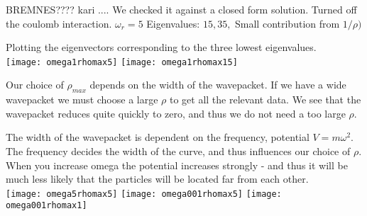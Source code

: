 \documentclass[a4paper,12pt, english]{article}
\begin{document}
BREMNES???? kari ....
We checked it against a closed form solution. Turned off the coulomb interaction. $\omega_r = 5$
Eigenvalues: $15, 35, $
Small contribution from $ 1/ \rho)$



Plotting the eigenvectors corresponding to the three lowest eigenvalues.\\

\texttt{[image: omega1rhomax5]}
\texttt{[image: omega1rhomax15]}

Our choice of $\rho_{max}$ depends on the width of the wavepacket. If we have a wide wavepacket we must choose a large $\rho$ to get all the relevant data. We see that the wavepacket reduces quite quickly to zero, and thus we do not need a too large $\rho$.  

The width of the wavepacket is dependent on the frequency, potential $V = m \omega ^ 2$. The frequency decides the width of the curve, and thus influences our choice of $\rho$. \\ 

When you increase omega the potential increases strongly - and thus it will be much less likely that the particles will be located far from each other.  \\

\texttt{[image: omega5rhomax5]}
\texttt{[image: omega001rhomax5]}
\texttt{[image: omega001rhomax1]}
\end{document}
